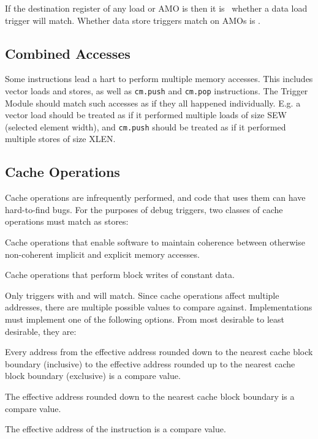 If the destination register of any load or AMO is \Rzero then it is
\unspecified\ whether a data load trigger will match.  Whether data store
triggers match on AMOs is \unspecified.

\subsection{Combined Accesses}

Some instructions lead a hart to perform multiple memory accesses. This includes
vector loads and stores, as well as {\tt cm.push} and {\tt cm.pop} instructions.
The Trigger Module should match such accesses as if they all happened
individually. E.g. a vector load should be treated as if it performed multiple
loads of size SEW (selected element width), and {\tt cm.push} should be treated
as if it performed multiple stores of size XLEN.

\subsection{Cache Operations}

\begin{steps}{
Cache operations are infrequently performed, and code that uses them can have
hard-to-find bugs. For the purposes of debug triggers, two classes of cache
operations must match as stores:}
\item Cache operations that enable software to maintain coherence between
otherwise non-coherent implicit and explicit memory accesses.
\item Cache operations that perform block writes of constant data.
\end{steps}

\begin{steps}{Only triggers with  and
 will match. Since cache operations affect multiple
addresses, there are multiple possible values to compare against.
Implementations must implement one of the following options.  From most
desirable to least desirable, they are:}
\item Every address from the effective address rounded down to the
    nearest cache block boundary (inclusive) to the effective address rounded up to
    the nearest cache block boundary (exclusive) is a compare value.
\item The effective address rounded down to the nearest cache block boundary is a
    compare value.
\item The effective address of the instruction is a compare value.
\end{steps}


